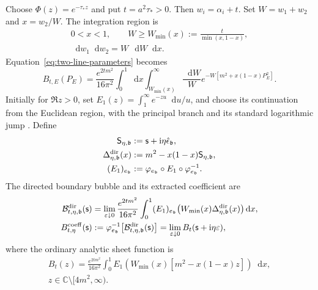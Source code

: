 \documentclass[final,5p,times,twocolumn,numbers,nopreprintline]{elsarticle}
\numberwithin{equation}{section}
\theoremstyle{definition}
\theoremstyle{remark}
\newcommand{\dd}{\mathop{}\!\mathrm d}
\newcommand{\ii}{\mathrm i}
\newcommand{\bb}{\mathfrak b}
\newcommand{\Ph}{\Phi}
\newcommand{\CC}{\mathbb C}
\newcommand{\ee}{e_{\bb}}
\newcommand{\epsvec}{\hat\epsilon_{\bb}}
\newcommand{\embed}{\varphi_{\ee}}
\newcommand{\EoneDir}{(E_1)_{\ee}}
\newcommand{\sMand}{\mathsf{s}}
\begin{document}
Choose \(\Ph(z)=e^{-\tau_*z}\) and put \(t=a^2\tau_*>0\).
Then \(w_i=\alpha_i+t\).
Set \(W=w_1+w_2\) and \(x=w_2/W\). The integration region is
\[
\begin{gathered}
 0<x<1,\qquad W\geq W_{\min}(x):=\frac{t}{\min(x,1-x)},\\
 \dd w_1\dd w_2=W\,\dd W\dd x .
\end{gathered}
\]
Equation~\eqref{eq:two-line-parameters} becomes
\begin{equation}
 B_{t,E}(P_E)
   =\frac{e^{2tm^2}}{16\pi^2}
        \int_0^1\dd x\int_{W_{\min}(x)}^\infty
        \frac{\dd W}{W}
             e^{-W[m^2+x(1-x)P_E^2]} .
 \label{eq:gaussian-W}
\end{equation}
Initially for \(\Re z>0\), set
\(E_1(z)=\int_1^\infty e^{-zu}\dd u/u\), and choose its
continuation from the Euclidean region, with the principal branch
and its standard logarithmic jump \cite{DLMF6}. Define
\begin{equation}
\begin{aligned}
 \mathsf S_{\eta,\bb}&:=\sMand+\ii\eta\epsvec,\\
 \Delta^{\rm dir}_{\eta,\bb}(x)
       &:=m^2-x(1-x)\mathsf S_{\eta,\bb},\\
 \EoneDir&:=\embed\circ E_1\circ\embed^{-1}.
\end{aligned}
 \label{eq:Gaussian-directed-channel}
\end{equation}
The directed boundary bubble and its extracted coefficient are
\begin{align}
 \mathcal B^{\rm dir}_{t,\eta,\bb}(\sMand)
 &=\lim_{\varepsilon\downarrow0}
   \frac{e^{2tm^2}}{16\pi^2}
      \int_0^1\EoneDir\!\left(
          W_{\min}(x)\Delta^{\rm dir}_{\eta,\bb}(x)
                                  \right)\dd x,
          \nonumber\\
 B^{\rm coeff}_{t,\eta}(\sMand)
 &:=\embed^{-1}\!\left[
          \mathcal B^{\rm dir}_{t,\eta,\bb}(\sMand)\right]
   =\lim_{\varepsilon\downarrow0}
                    B_t(\sMand+\ii\eta\varepsilon),
 \label{eq:Gaussian-directed-boundary-and-coefficient}
\end{align}
where the ordinary analytic sheet function is
\begin{equation}
\begin{gathered}
 B_t(z)=\frac{e^{2tm^2}}{16\pi^2}
    \int_0^1 E_1\!\left(
       W_{\min}(x)[m^2-x(1-x)z]\right)\dd x,\\
 z\in\CC\setminus[4m^2,\infty).
\end{gathered}
 \label{eq:gaussian-E1}
\end{equation}
\end{document}
